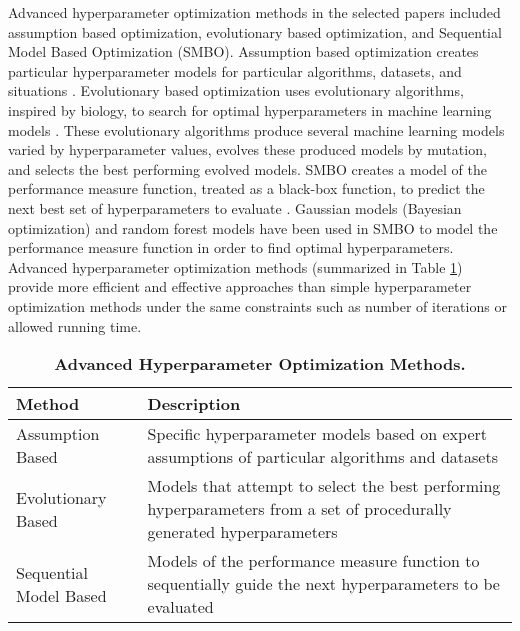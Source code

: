 Advanced hyperparameter optimization methods in the selected papers included assumption based optimization, evolutionary based optimization, and Sequential Model Based Optimization (SMBO). Assumption based optimization creates particular hyperparameter models for particular algorithms, datasets, and situations \cite{Schilling:2015}. Evolutionary based optimization uses evolutionary algorithms, inspired by biology, to search for optimal hyperparameters in machine learning models \cite{Whitley:1996}. These evolutionary algorithms produce several machine learning models varied by hyperparameter values, evolves these produced models by mutation, and selects the best performing evolved models. SMBO creates a model of the performance measure function, treated as a black-box function, to predict the next best set of hyperparameters to evaluate \cite{Jones:1998}. Gaussian models (Bayesian optimization) \cite{Snoek:2012} and random forest models \cite{Hutter:2011} have been used in SMBO to model the performance measure function in order to find optimal hyperparameters. Advanced hyperparameter optimization methods (summarized in Table \ref{table:advanced_methods}) provide more efficient and effective approaches than simple hyperparameter optimization methods under the same constraints such as number of iterations or allowed running time.

\begin{table}
\centering
\caption{\textbf{Advanced Hyperparameter Optimization Methods.}}
\label{table:advanced_methods}
\begin{tabular}{p{1.25in}p{2in}}
	\toprule
	\textbf{Method} & \textbf{Description}\\
	\midrule \addlinespace
	Assumption Based & Specific hyperparameter models based on expert assumptions of particular algorithms and datasets
	\addlinespace\\ 
	Evolutionary Based & Models that attempt to select the best performing hyperparameters from a set of procedurally generated hyperparameters
	\addlinespace\\ 
	Sequential Model Based & Models of the performance measure function to sequentially guide the next hyperparameters to be evaluated
	\addlinespace \\
	\bottomrule
\end{tabular}
\end{table}

